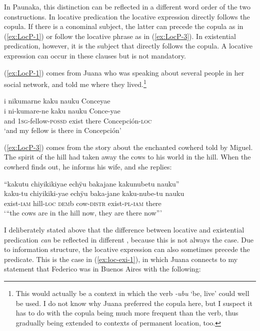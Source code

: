 In Paunaka, this distinction can be reflected in a different word order of the two constructions. In locative predication the locative expression directly follows the copula. If there is a conominal subject, the latter can precede the copula as in (\ref{ex:LocP-1}) or follow the locative phrase as in (\ref{ex:LocP-3}). In existential predication, however, it is the subject that directly follows the copula. A locative expression can occur in these clauses but is not mandatory.

(\ref{ex:LocP-1}) comes from Juana who was speaking about several people in her social network, and told me where they lived.\footnote{This would actually be a context in which the verb \textit{-ubu} ‘be, live’ could well be used. I do not know why Juana preferred the copula here, but I suspect it has to do with the copula being much more frequent than the verb, thus gradually being extended to contexts of permanent location, too.}

\ea\label{ex:LocP-1}
\begingl 
\glpreamble i nikumarne kaku nauku Conceyae\\
\gla i ni-kumare-ne kaku nauku Conce-yae\\ 
\glb and 1\textsc{sg}-fellow-\textsc{possd} exist there Concepción-\textsc{loc}\\ 
\glft ‘and my fellow is there in Concepción’\\ 
\endgl
\trailingcitation{[jxx-p110923l-2.133]}
\xe

(\ref{ex:LocP-3}) comes from the story about the enchanted cowherd told by Miguel. The spirit of the hill had taken away the cows to his world in the hill. When the cowherd finds out, he informs his wife, and she replies:

\ea\label{ex:LocP-3}
\begingl
\glpreamble “kakutu chiyikikiyae echÿu bakajane kakunubetu nauku”\\
\gla kaku-tu chiyikiki-yae echÿu baka-jane kaku-nube-tu nauku\\
\glb exist-\textsc{iam} hill-\textsc{loc} \textsc{dem}b cow-\textsc{distr} exist-\textsc{pl}-\textsc{iam} there\\
\glft ‘“the cows are in the hill now, they are there now”’
\endgl
\trailingcitation{[mxx-n151017l-1.64]}
\xe

I deliberately stated above that the difference between locative and existential predication \textit{can} be reflected in different , because this is not always the case. Due to information structure, the locative expression can also sometimes precede the predicate. This is the case in (\ref{ex:loc-exi-1}), in which Juana connects to my statement that Federico was in Buenos Aires with the following:

